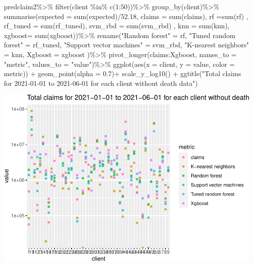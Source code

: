 \documentclass[
]{article}
\newenvironment{Shaded}{\begin{snugshade}}{\end{snugshade}}
\newcommand{\AttributeTok}[1]{\textcolor[rgb]{0.77,0.63,0.00}{#1}}
\newcommand{\DecValTok}[1]{\textcolor[rgb]{0.00,0.00,0.81}{#1}}
\newcommand{\FloatTok}[1]{\textcolor[rgb]{0.00,0.00,0.81}{#1}}
\newcommand{\FunctionTok}[1]{\textcolor[rgb]{0.00,0.00,0.00}{#1}}
\newcommand{\NormalTok}[1]{#1}
\newcommand{\OtherTok}[1]{\textcolor[rgb]{0.56,0.35,0.01}{#1}}
\newcommand{\SpecialCharTok}[1]{\textcolor[rgb]{0.00,0.00,0.00}{#1}}
\newcommand{\StringTok}[1]{\textcolor[rgb]{0.31,0.60,0.02}{#1}}
\begin{document}
\begin{Shaded}
\begin{Highlighting}[]
\NormalTok{predclaim2}\SpecialCharTok{\%\textgreater{}\%}
  \FunctionTok{filter}\NormalTok{(client }\SpecialCharTok{\%in\%} \FunctionTok{c}\NormalTok{(}\DecValTok{1}\SpecialCharTok{:}\DecValTok{50}\NormalTok{))}\SpecialCharTok{\%\textgreater{}\%}
  \FunctionTok{group\_by}\NormalTok{(client)}\SpecialCharTok{\%\textgreater{}\%}
  \FunctionTok{summarise}\NormalTok{(}\AttributeTok{expected =} \FunctionTok{sum}\NormalTok{(expected)}\SpecialCharTok{/}\FloatTok{52.18}\NormalTok{,}
        \AttributeTok{claims =} \FunctionTok{sum}\NormalTok{(claims),}
          \AttributeTok{rf =}\FunctionTok{sum}\NormalTok{(rf) ,}
         \AttributeTok{rf\_tuned =} \FunctionTok{sum}\NormalTok{(rf\_tuned),}
         \AttributeTok{svm\_rbd =} \FunctionTok{sum}\NormalTok{(svm\_rbd) ,}
         \AttributeTok{knn =} \FunctionTok{sum}\NormalTok{(knn),}
         \AttributeTok{xgboost=} \FunctionTok{sum}\NormalTok{(xgboost))}\SpecialCharTok{\%\textgreater{}\%}
  \FunctionTok{rename}\NormalTok{(}\StringTok{"Random forest"} \OtherTok{=}\NormalTok{ rf, }\StringTok{"Tuned random forest"} \OtherTok{=}\NormalTok{ rf\_tuned, }
    \StringTok{"Support vector machines"} \OtherTok{=}\NormalTok{ svm\_rbd, }\StringTok{"K{-}nearest neighbors"} \OtherTok{=}\NormalTok{ knn, }\AttributeTok{Xgboost =}\NormalTok{ xgboost )}\SpecialCharTok{\%\textgreater{}\%}
  \FunctionTok{pivot\_longer}\NormalTok{(claims}\SpecialCharTok{:}\NormalTok{Xgboost, }\AttributeTok{names\_to =} \StringTok{"metric"}\NormalTok{, }\AttributeTok{values\_to =} \StringTok{"value"}\NormalTok{)}\SpecialCharTok{\%\textgreater{}\%}
  \FunctionTok{ggplot}\NormalTok{(}\FunctionTok{aes}\NormalTok{(}\AttributeTok{x =}\NormalTok{ client, }\AttributeTok{y =}\NormalTok{ value, }\AttributeTok{color =}\NormalTok{ metric)) }\SpecialCharTok{+} \FunctionTok{geom\_point}\NormalTok{(}\AttributeTok{alpha =} \FloatTok{0.7}\NormalTok{)}\SpecialCharTok{+}
  \FunctionTok{scale\_y\_log10}\NormalTok{() }\SpecialCharTok{+}
  \FunctionTok{ggtitle}\NormalTok{(}\StringTok{"Total claims for 2021{-}01{-}01 to 2021{-}06{-}01 for each client without death data"}\NormalTok{)}
\end{Highlighting}
\end{Shaded}

\includegraphics{figures/report/fig-unnamed-chunk-87-3.pdf}
\end{document}
